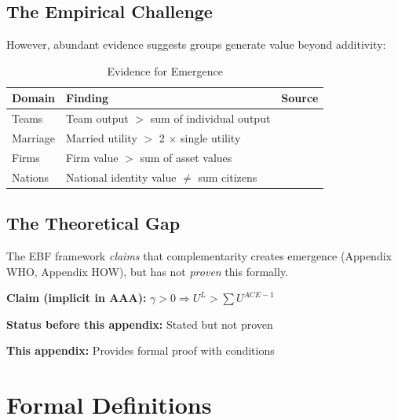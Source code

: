\subsection{The Empirical Challenge}

However, abundant evidence suggests groups generate value beyond additivity:

\begin{table}[htbp]
\centering
\caption{Evidence for Emergence}
\label{tab:emergence-evidence}
\renewcommand{\arraystretch}{1.3}
\begin{tabular}{@{}lll@{}}
\toprule
\textbf{Domain} & \textbf{Finding} & \textbf{Source} \\
\midrule
Teams & Team output $>$ sum of individual output & \citet{woolley2010} \\
Marriage & Married utility $>$ 2 $\times$ single utility & \citet{stutzer2006} \\
Firms & Firm value $>$ sum of asset values & \citet{milgromroberts1995} \\
Nations & National identity value $\neq$ sum citizens & \citet{akerlof2000} \\
\bottomrule
\end{tabular}
\end{table}

\subsection{The Theoretical Gap}

The EBF framework \textit{claims} that complementarity creates emergence
(Appendix WHO, Appendix HOW), but has not \textit{proven} this formally.

\begin{tcolorbox}[colback=red!5!white, colframe=red!75!black,
    title=The Gap We Fill]
\textbf{Claim (implicit in AAA):} $\gamma > 0 \Rightarrow U^L > \sum U^{ACE-1}$

\textbf{Status before this appendix:} Stated but not proven

\textbf{This appendix:} Provides formal proof with conditions
\end{tcolorbox}


\section{Formal Definitions}
\label{sec:let-definitions}

